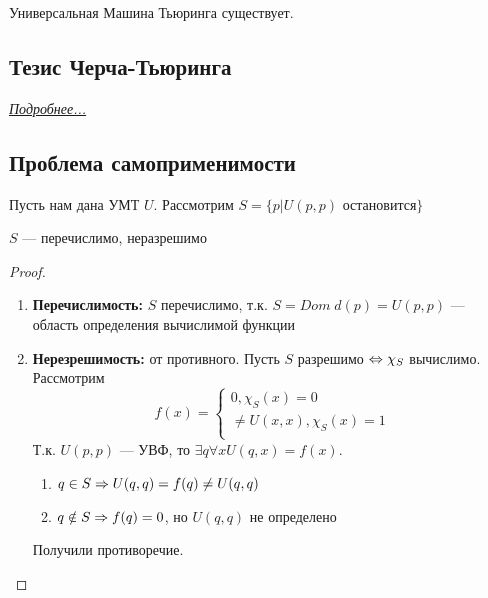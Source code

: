 
\begin{theorem}
    Универсальная Машина Тьюринга существует.
\end{theorem}

\subsection{Тезис Черча-Тьюринга}
\href{https://ru.wikipedia.org/wiki/Тезис_Чёрча_—_Тьюринга}{\textit{Подробнее...}}

\subsection{Проблема самоприменимости}
Пусть нам дана УМТ \(U\). Рассмотрим \(S = \{p | U(p, p) \text{ остановится}\}\)

\begin{theorem}[Тьюринга]
    \(S\) --- перечислимо, неразрешимо
\end{theorem}
\begin{proof}\indent
    \begin{enumerate}
        \item[] \textbf{Перечислимость:} \(S\) перечислимо, т.к. \(S = Dom\;d(p) = U(p, p)\) --- область определения вычислимой функции
        \item[] \textbf{Нерезрешимость:} от противного. Пусть \(S\) разрешимо \(\Leftrightarrow \chi_S\) вычислимо. Рассмотрим 
        \[f(x) = \left\{\begin{array}{l}
            0, \chi_S(x) = 0 \\
            \ne U(x, x), \chi_S(x) = 1\\
        \end{array}\right.\]
        Т.к. \(U(p, p)\) --- УВФ, то \(\exists q \forall x U(q, x) = f(x)\). 
        \begin{enumerate}
            \item \(q \in S \Rightarrow U(q, q) = f(q) \ne U(q, q)\)
            \item \(q \notin S \Rightarrow f(q) = 0\), но \(U(q, q)\) не определено
        \end{enumerate}
        Получили противоречие.
    \end{enumerate}
\end{proof}

